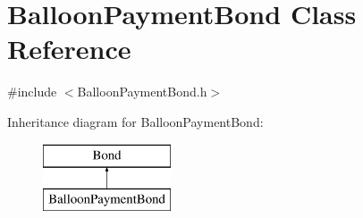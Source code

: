 \hypertarget{classBalloonPaymentBond}{}\section{Balloon\+Payment\+Bond Class Reference}
\label{classBalloonPaymentBond}


{\ttfamily \#include $<$Balloon\+Payment\+Bond.\+h$>$}

Inheritance diagram for Balloon\+Payment\+Bond\+:\begin{figure}[H]
\begin{center}
\leavevmode
\includegraphics[height=2.000000cm]{classBalloonPaymentBond}
\end{center}
\end{figure}
